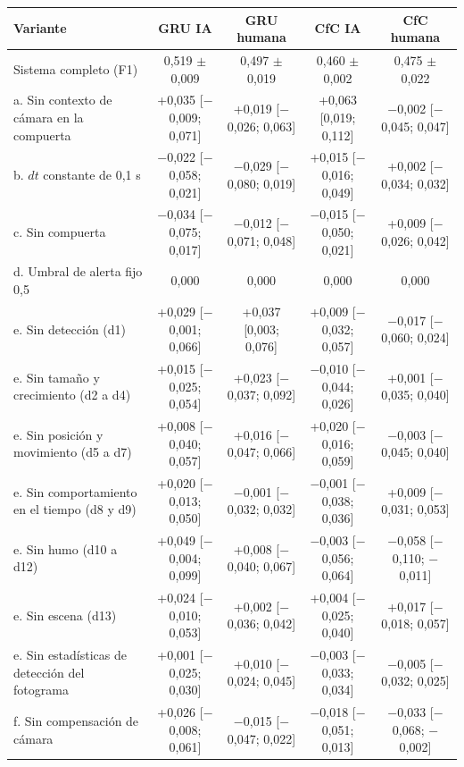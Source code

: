 \begin{tabular}{|l|c|c|c|c|}
\hline
\textbf{Variante} & \textbf{GRU IA} & \textbf{GRU humana} & \textbf{CfC IA} & \textbf{CfC humana} \\ \hline
Sistema completo (F1) & 0{,}519 $\pm$ 0{,}009 & 0{,}497 $\pm$ 0{,}019 & 0{,}460 $\pm$ 0{,}002 & 0{,}475 $\pm$ 0{,}022 \\ \hline
a. Sin contexto de cámara en la compuerta & +0{,}035 [$-$0{,}009; 0{,}071] & +0{,}019 [$-$0{,}026; 0{,}063] & +0{,}063 [0{,}019; 0{,}112] & $-$0{,}002 [$-$0{,}045; 0{,}047] \\ \hline
b. $dt$ constante de 0{,}1 s & $-$0{,}022 [$-$0{,}058; 0{,}021] & $-$0{,}029 [$-$0{,}080; 0{,}019] & +0{,}015 [$-$0{,}016; 0{,}049] & +0{,}002 [$-$0{,}034; 0{,}032] \\ \hline
c. Sin compuerta & $-$0{,}034 [$-$0{,}075; 0{,}017] & $-$0{,}012 [$-$0{,}071; 0{,}048] & $-$0{,}015 [$-$0{,}050; 0{,}021] & +0{,}009 [$-$0{,}026; 0{,}042] \\ \hline
d. Umbral de alerta fijo 0{,}5 & 0{,}000 & 0{,}000 & 0{,}000 & 0{,}000 \\ \hline
e. Sin detección (d1) & +0{,}029 [$-$0{,}001; 0{,}066] & +0{,}037 [0{,}003; 0{,}076] & +0{,}009 [$-$0{,}032; 0{,}057] & $-$0{,}017 [$-$0{,}060; 0{,}024] \\ \hline
e. Sin tamaño y crecimiento (d2 a d4) & +0{,}015 [$-$0{,}025; 0{,}054] & +0{,}023 [$-$0{,}037; 0{,}092] & $-$0{,}010 [$-$0{,}044; 0{,}026] & +0{,}001 [$-$0{,}035; 0{,}040] \\ \hline
e. Sin posición y movimiento (d5 a d7) & +0{,}008 [$-$0{,}040; 0{,}057] & +0{,}016 [$-$0{,}047; 0{,}066] & +0{,}020 [$-$0{,}016; 0{,}059] & $-$0{,}003 [$-$0{,}045; 0{,}040] \\ \hline
e. Sin comportamiento en el tiempo (d8 y d9) & +0{,}020 [$-$0{,}013; 0{,}050] & $-$0{,}001 [$-$0{,}032; 0{,}032] & $-$0{,}001 [$-$0{,}038; 0{,}036] & +0{,}009 [$-$0{,}031; 0{,}053] \\ \hline
e. Sin humo (d10 a d12) & +0{,}049 [$-$0{,}004; 0{,}099] & +0{,}008 [$-$0{,}040; 0{,}067] & $-$0{,}003 [$-$0{,}056; 0{,}064] & $-$0{,}058 [$-$0{,}110; $-$0{,}011] \\ \hline
e. Sin escena (d13) & +0{,}024 [$-$0{,}010; 0{,}053] & +0{,}002 [$-$0{,}036; 0{,}042] & +0{,}004 [$-$0{,}025; 0{,}040] & +0{,}017 [$-$0{,}018; 0{,}057] \\ \hline
e. Sin estadísticas de detección del fotograma & +0{,}001 [$-$0{,}025; 0{,}030] & +0{,}010 [$-$0{,}024; 0{,}045] & $-$0{,}003 [$-$0{,}033; 0{,}034] & $-$0{,}005 [$-$0{,}032; 0{,}025] \\ \hline
f. Sin compensación de cámara & +0{,}026 [$-$0{,}008; 0{,}061] & $-$0{,}015 [$-$0{,}047; 0{,}022] & $-$0{,}018 [$-$0{,}051; 0{,}013] & $-$0{,}033 [$-$0{,}068; $-$0{,}002] \\ \hline
\end{tabular}

